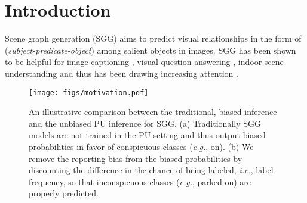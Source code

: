 \documentclass[sigconf]{acmart}
\begin{document}
\maketitle
\pagestyle{plain}


\section{Introduction}
Scene graph generation (SGG) \cite{lu2016visual} aims to predict visual relationships in the form of (\textit{subject-predicate-object}) among salient objects in images.
SGG has been shown to be helpful for image captioning \cite{yao2018exploring,yang2019auto,li2019know}, visual question answering \cite{teney2017graph,shi2019explainable}, indoor scene understanding \cite{armeni20193d, chiou2020zero} and thus has been drawing increasing attention \cite{zellers2018neural,yang2018graph,herzig2018mapping,chen2019knowledge,chen2019scene,gu2019scene,chen2019soft,dornadula2019visual,zareian2020bridging,Khademi_Schulte_2020,tang2020unbiased,Lin_2020_CVPR,DBLP:conf/bmvc/WangPL20,yan2020pcpl,knyazev2020graphdensity,he2020learning,wang2020sketching,zareian2020learning,sharifzadeh2020classification,10.1145/3394171.3413566,9084259,10.1145/3394171.3413575,hung2020contextual,tian2020part,DBLP:journals/corr/abs-2001-04735,chiou2021visual,chiou2021st}.

\begin{figure}[t!]
\begin{center}
\texttt{[image: figs/motivation.pdf]}
\end{center}
\vspace{-1.5em}
  \caption{
  An illustrative comparison between the traditional, biased inference and the unbiased PU inference for SGG.
  (a) Traditionally SGG models are not trained in the PU setting and thus output biased probabilities in favor of conspicuous classes (\emph{e.g.}, {\selectfont on}).
  (b) We remove the reporting bias from the biased probabilities by discounting the difference in the chance of being labeled, \emph{i.e.}, label frequency, so that inconspicuous classes (\emph{e.g.}, {\selectfont parked on}) are properly predicted.
  }
\label{fig:motivation}
\vspace{-1.5em}
\end{figure}
\end{document}
